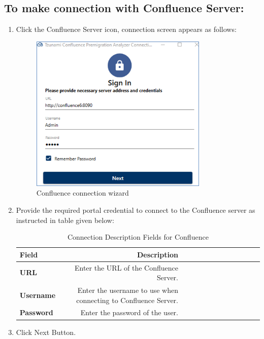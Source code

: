 \subsection*{To make connection with Confluence Server:}
\begin{enumerate}
	\item Click the Confluence Server icon, connection screen appears as follows:
	\begin{figure} 
		\centering
		\includegraphics[width=0.8\textwidth]{Images/Confluence connection wizard.png}
		\caption{Confluence connection wizard}
	\end{figure}
\item Provide the required portal credential to connect to the Confluence server as instructed in table given below:
\begin{table}[] \centering
	\begin{small}
		\begin{tabular}{@{}lrrrrrrrrrrrr@{}} \toprule
			\textbf{Field}  & \textbf{Description} \\ \midrule 
			\textbf{URL} & Enter the URL of the Confluence Server.\\ 
			\textbf{Username} & Enter the username to use when connecting to Confluence Server.\\ 
			\textbf{Password} & Enter the password of the user.\\ [1ex]
			\bottomrule
		\end{tabular}
	\end{small}
	\caption{Connection Description Fields for Confluence}
	\label{table:Confluence} %
\end{table}
\item Click Next Button.
\end{enumerate}

